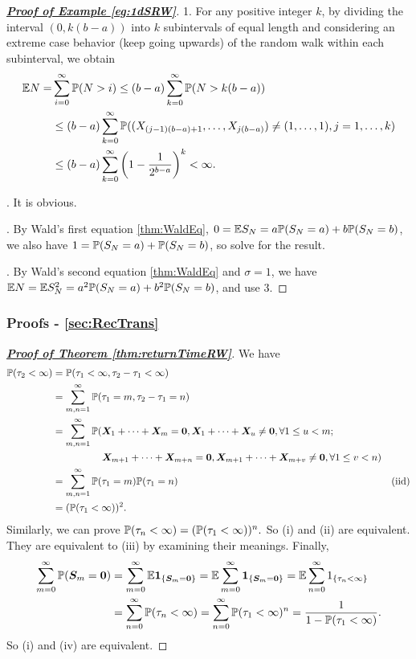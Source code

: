 \documentclass[10pt,a4paper]{article}
\begin{document}
\begin{proof}[\underline{\textbf{Proof of Example \ref{eg:1dSRW}}}]
	1. For any positive integer $k$, by dividing the interval $(0,k(b-a))$ into $k$ subintervals of
	equal length and considering an extreme case behavior (keep going upwards) of the random
	walk within each subinterval, we obtain
	\begin{align*}
		\mathbb E N = &\sum_{i=0}^{\infty }\mathbb P(N>i) \leq (b-a)\sum_{k=0}^{\infty }\mathbb P(N>k(b-a)) \\
		&\leq (b-a)\sum_{k=0}^{\infty } \mathbb P((X_{(j-1)(b-a)+1},\ldots,X_{j(b-a)})\neq (1,\ldots,1), j=1,\ldots,k) \\
		&\leq (b-a)\sum_{k=0}^{\infty } \left( {1-\frac{1}{2^{b-a}}}\right)^k<\infty. 
	\end{align*}

	. It is obvious.

	. By Wald's first equation \ref{thm:WaldEq}, $0=\mathbb E S_N = a\mathbb P(S_N=a)+b\mathbb P(S_N=b)$, we also have $1=\mathbb P(S_N=a)+\mathbb P(S_N=b)$, so solve for the result.
	
	. By Wald's second equation \ref{thm:WaldEq} and $\sigma=1$, we have $\mathbb E N=\mathbb E S_N^2 = a^2 \mathbb P(S_N=a) + b^2 \mathbb P (S_N=b)$, and use 3.  
\end{proof}

\subsubsection{Proofs - \ref{sec:RecTrans}}\label{sec:proof-RecTrans}
\begin{proof}[\underline{\textbf{Proof of Theorem \ref{thm:returnTimeRW}}}] We have
	\begin{align*} 
		\mathbb P(\tau_{2}<\infty)& =\mathbb P(\tau_{1}<\infty,\tau_{2}-\tau_{1}<\infty) \\
		&=\sum_{m,n=1}^\infty \mathbb P(\tau_1=m,\tau_2-\tau_1=n) \\
		&= \sum_{m,n=1}^\infty \mathbb P({\boldsymbol X}_1+\cdots+{\boldsymbol X}_m={\boldsymbol 0},{\boldsymbol X}_1+\cdots+{\boldsymbol X}_u\neq{\boldsymbol 0},\forall 1\leq u<m; \\
		&\qquad \qquad \quad {\boldsymbol X}_{m+1}+\cdots+{\boldsymbol X}_{m+n}={\boldsymbol 0},{\boldsymbol X}_{m+1}+\cdots+{\boldsymbol X}_{m+v}\neq{\boldsymbol 0},\forall 1\leq v<n) \\
		&=\sum_{m,n=1}^\infty \mathbb P(\tau_1=m)\mathbb P(\tau_1=n) & (\text{iid}) \\
		&=(\mathbb P(\tau_1<\infty ))^2.
	\end{align*} 
	Similarly, we can prove $\mathbb P(\tau_n<\infty)=(\mathbb P(\tau_1<\infty))^n.$ So (i) and (ii) are equivalent. They are equivalent to (iii) by examining their meanings. Finally, 
	\begin{align*}
		\sum_{m=0}^{\infty}\mathbb P({\boldsymbol S}_{m}={\boldsymbol 0})& =\sum_{m=0}^{\infty}\mathbb E{\boldsymbol 1}_{\{{\boldsymbol S}_{m}={\boldsymbol 0}\}}=\mathbb E\sum_{m=0}^{\infty}{\boldsymbol 1}_{\{{\boldsymbol S}_{m}={\boldsymbol 0}\}} 
		=\mathbb E\sum_{n=0}^\infty1_{\{\tau_n<\infty\}} \\
		&=\sum_{n=0}^\infty \mathbb P(\tau_n<\infty)=\sum_{n=0}^\infty\mathbb P(\tau_1<\infty)^n=\frac{1}{1-\mathbb P(\tau_1<\infty )}.
	\end{align*} 
	So (i) and (iv) are equivalent.
\end{proof}
\end{document}
